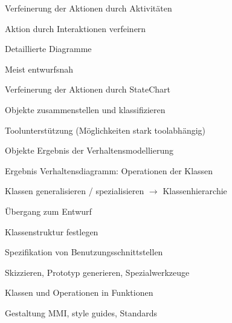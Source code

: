 \documentclass[a4paper]{article}
\begin{document}
\begin{multicols}{3}
  \begin{itemize*}
    \item Verfeinerung der Aktionen durch Aktivitäten
    \item Aktion durch Interaktionen verfeinern
          \begin{itemize*}
            \item Detaillierte Diagramme
            \item Meist entwurfsnah
          \end{itemize*}
    \item Verfeinerung der Aktionen durch StateChart
    \item Objekte zusammenstellen und klassifizieren
          \begin{itemize*}
            \item Toolunterstützung (Möglichkeiten stark toolabhängig)
            \item Objekte Ergebnis der Verhaltensmodellierung
            \item Ergebnis Verhaltensdiagramm: Operationen der Klassen
            \item Klassen generalisieren / spezialisieren $\rightarrow$ Klassenhierarchie
          \end{itemize*}
    \item Übergang zum Entwurf
          \begin{itemize*}
            \item Klassenstruktur festlegen
          \end{itemize*}
    \item Spezifikation von Benutzungsschnittstellen
          \begin{itemize*}
            \item Skizzieren, Prototyp generieren, Spezialwerkzeuge
            \item Klassen und Operationen in Funktionen
            \item Gestaltung MMI, style guides, Standards
          \end{itemize*}
  \end{itemize*}


\end{multicols}
\end{document}
